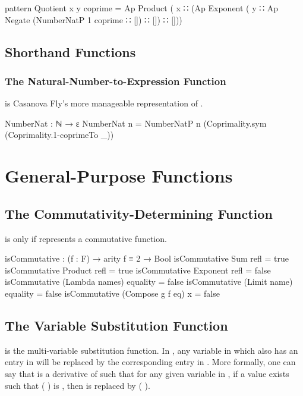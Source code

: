 \documentclass{report}
\begin{document}
\begin{code}
  pattern Quotient x y coprime =
    Ap Product
       ( x
       ∷ (Ap Exponent
             ( y
             ∷ Ap Negate (NumberNatP 1 coprime ∷ [])
             ∷ [])
       ∷ []))
\end{code}

\section{Shorthand Functions}

\subsection{The Natural-Number-to-Expression Function}
  is Casanova Fly's more manageable representation of .

\begin{code}
  NumberNat : ℕ → ε
  NumberNat n = NumberNatP n (Coprimality.sym (Coprimality.1-coprimeTo _))
\end{code}

\chapter{General-Purpose Functions}

\section{The Commutativity-Determining Function}
   is  only if  represents a commutative function.

\begin{code}
  isCommutative : (f : F) → arity f ≡ 2 → Bool
  isCommutative Sum refl = true
  isCommutative Product refl = true
  isCommutative Exponent refl = false
  isCommutative (Lambda names) equality = false
  isCommutative (Limit name) equality = false
  isCommutative (Compose g f eq) x = false
\end{code}

\section{The Variable Substitution Function}\label{sec:varSubstM-def}
 is the multi-variable substitution function.  In   , any variable in  which also has an entry in  will be replaced by the corresponding  entry in .  More formally, one can say that    is a derivative of  such that for any given variable  in , if a value  exists such that  \AgdaSymbol(  \AgdaSymbol) is , then  is replaced by  \AgdaSymbol(  \AgdaSymbol).
\end{document}
